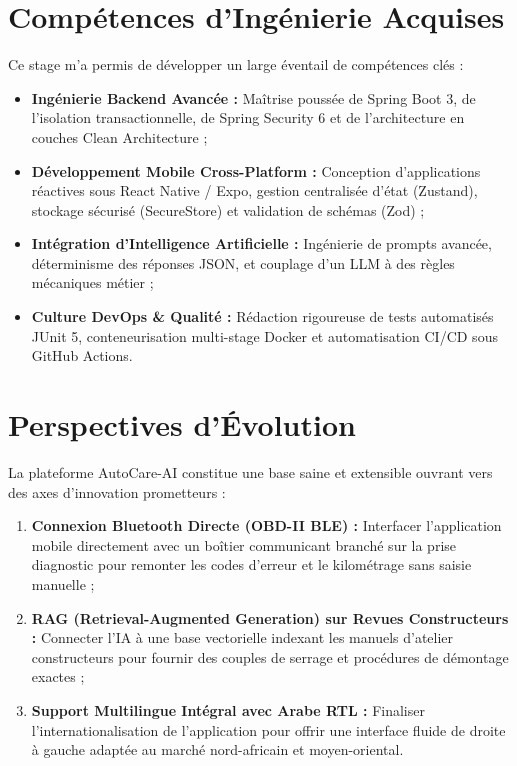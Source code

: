 \documentclass[12pt,a4paper,oneside]{report}
\newcommand{\bpuce}{\textcolor{midBlue}{$\blacktriangleright$}\;}
\begin{document}
\section{Comp\'etences d'Ing\'enierie Acquises}
Ce stage m'a permis de d\'evelopper un large \'eventail de comp\'etences cl\'es :
\begin{itemize}[label=\bpuce]
  \item \textbf{Ing\'enierie Backend Avanc\'ee :} Ma\^itrise pouss\'ee de Spring Boot 3, de l'isolation transactionnelle, de Spring Security 6 et de l'architecture en couches Clean Architecture ;
  \item \textbf{D\'eveloppement Mobile Cross-Platform :} Conception d'applications r\'eactives sous React Native / Expo, gestion centralis\'ee d'\'etat (Zustand), stockage s\'ecuris\'e (SecureStore) et validation de sch\'emas (Zod) ;
  \item \textbf{Int\'egration d'Intelligence Artificielle :} Ing\'enierie de prompts avanc\'ee, d\'eterminisme des r\'eponses JSON, et couplage d'un LLM \`a des r\`egles m\'ecaniques m\'etier ;
  \item \textbf{Culture DevOps \& Qualit\'e :} R\'edaction rigoureuse de tests automatis\'es JUnit 5, conteneurisation multi-stage Docker et automatisation CI/CD sous GitHub Actions.
\end{itemize}

\section{Perspectives d'\'Evolution}
La plateforme AutoCare-AI constitue une base saine et extensible ouvrant vers des axes d'innovation prometteurs :
\begin{enumerate}[label=\textbf{\arabic*.}]
  \item \textbf{Connexion Bluetooth Directe (OBD-II BLE) :} Interfacer l'application mobile directement avec un bo\^itier communicant branch\'e sur la prise diagnostic pour remonter les codes d'erreur et le kilom\'etrage sans saisie manuelle ;
  \item \textbf{RAG (Retrieval-Augmented Generation) sur Revues Constructeurs :} Connecter l'IA \`a une base vectorielle indexant les manuels d'atelier constructeurs pour fournir des couples de serrage et proc\'edures de d\'emontage exactes ;
  \item \textbf{Support Multilingue Int\'egral avec Arabe RTL :} Finaliser l'internationalisation de l'application pour offrir une interface fluide de droite \`a gauche adapt\'ee au march\'e nord-africain et moyen-oriental.
\end{enumerate}
\end{document}
